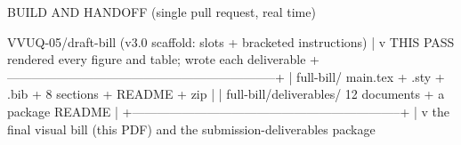\begin{asciifig}
BUILD AND HANDOFF (single pull request, real time)

  VVUQ-05/draft-bill (v3.0 scaffold: slots + bracketed instructions)
                          |
                          v
  THIS PASS  rendered every figure and table; wrote each deliverable
  +-----------------------------------------------------------------+
  | full-bill/  main.tex + .sty + .bib + 8 sections + README + zip  |
  | full-bill/deliverables/  12 documents + a package README        |
  +-----------------------------------------------------------------+
                          |
                          v
  the final visual bill (this PDF) and the submission-deliverables package
\end{asciifig}
